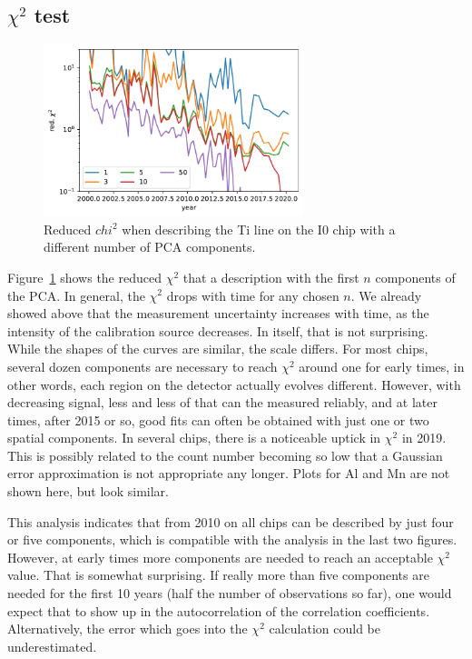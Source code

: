 \documentclass[]{spie}  %
\begin{document}
\subsection{$\chi^2$ test}
\begin{figure} [ht]
  \begin{center}
    \includegraphics[height=5cm]{figures/chi2.pdf}
  \end{center}
  \caption
      {Reduced $chi^2$ when describing the Ti line on the I0 chip with a different number of PCA components.
        \label{fig:chi2}}
\end{figure}

Figure~\ref{fig:chi2} shows the reduced $\chi^2$ that a description with the first $n$ components of the PCA. In general, the $\chi^2$ drops with time for any chosen $n$. We already showed above that the measurement uncertainty increases with time, as the intensity of the calibration source decreases. In itself, that is not surprising. While the shapes of the curves are similar, the scale differs. For most chips, several dozen components are necessary to reach  $\chi^2$ around one for early times, in other words, each region on the detector actually evolves different. However, with decreasing signal, less and less of that can the measured reliably, and at later times, after 2015 or so, good fits can often be obtained with just one or two spatial components. In several chips, there is a noticeable uptick in $\chi^2$ in 2019. This is possibly related to the count number becoming so low that a Gaussian error approximation is not appropriate any longer. Plots for Al and Mn are not shown here, but look similar.

This analysis indicates that from 2010 on all chips can be described by just four or five components, which is compatible with the analysis in the last two figures. However, at early times more components are needed to reach an acceptable $\chi^2$ value. That is somewhat surprising. If really more than five components are needed for the first 10 years (half the number of observations so far), one would expect that to show up in the autocorrelation of the correlation coefficients. Alternatively, the error which goes into the $\chi^2$ calculation could be underestimated.
\end{document}
